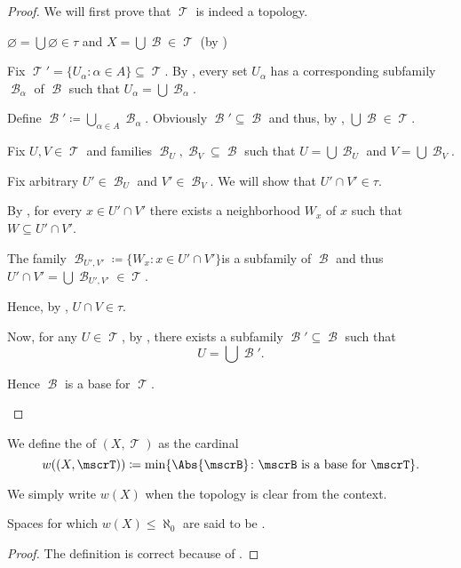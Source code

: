 \begin{proof}
  We will first prove that \( \mscrT \) is indeed a topology.

  \begin{RefList}
     \( \varnothing = \bigcup \varnothing \in \tau \) and \( X = \bigcup \mscrB \in \mscrT \) (by )

     Fix \( \mscrT' = \{ U_\alpha \colon \alpha \in A \} \subseteq \mscrT \). By , every set \( U_\alpha \) has a corresponding subfamily \( \mscrB_\alpha \) of \( \mscrB \) such that \( U_\alpha = \bigcup \mscrB_\alpha \).

    Define \( \mscrB' \coloneqq \bigcup_{\alpha \in A} \mscrB_\alpha \). Obviously \( \mscrB' \subseteq \mscrB \) and thus, by , \( \bigcup \mscrB \in \mscrT \).

     Fix \( U, V \in \mscrT \) and families \( \mscrB_U, \mscrB_V \subseteq \mscrB \) such that \( U = \bigcup \mscrB_U \) and \( V = \bigcup \mscrB_V \).

    Fix arbitrary \( U' \in \mscrB_U \) and \( V' \in \mscrB_V \). We will show that \( U' \cap V' \in \tau \).

    By , for every \( x \in U' \cap V' \) there exists a neighborhood \( W_x \) of \( x \) such that \( W \subseteq U' \cap V' \).

    The family \( \mscrB_{U',V'} \coloneqq \{ W_x \colon x \in U' \cap V' \} \)\AOC is a subfamily of \( \mscrB \) and thus \( U' \cap V' = \bigcup \mscrB_{U',V'} \in \mscrT \).

    Hence, by , \( U \cap V \in \tau \).

    Now, for any \( U \in \mscrT \), by , there exists a subfamily \( \mscrB' \subseteq \mscrB \) such that
    \begin{equation*}
      U = \bigcup \mscrB'.
    \end{equation*}

    Hence \( \mscrB \) is a base for \( \mscrT \).
  \end{RefList}
\end{proof}

\begin{definition}\label{def:topological_space_weight}
  We define the  of \( (X, \mscrT) \) as the cardinal
  \begin{equation*}
    w((X, \mscrT)) \coloneqq \min \{ \Abs{\mscrB} \colon \mscrB \text{ is a base for } \mscrT \}.
  \end{equation*}

  We simply write \( w(X) \) when the topology is clear from the context.

  Spaces for which \( w(X) \leq \aleph_0 \) are said to be .
\end{definition}
\begin{proof}
  The definition is correct because of .
\end{proof}

